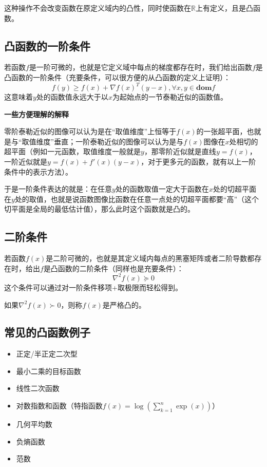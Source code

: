 \documentclass[12pt,a4paper]{book}
\begin{document}
这种操作不会改变函数在原定义域内的凸性，同时使函数在$\mathbb{R}$上有定义，且是凸函数。

\subsection{凸函数的一阶条件}

若函数$f$是一阶可微的，也就是它定义域中每点的梯度都存在时，我们给出函数$f$是凸函数的一阶条件（充要条件，可以很方便的从凸函数的定义上证明）：
$$f(y)\geq f(x)+\nabla f(x)^T(y-x),\forall x,y\in \textbf{dom}f$$
这意味着$y$处的函数值永远大于以$x$为起始点的一节泰勒近似的函数值。

\textbf{一些方便理解的解释}

零阶泰勒近似的图像可以认为是在“取值维度”上恒等于$f(x)$的一张超平面，也就是与“取值维度”垂直；一阶泰勒近似的图像可以认为是与$f(x)$图像在$x$处相切的超平面（例如一元函数，取值维度一般就是$y$，那零阶近似就是直线$y=f(x)$，一阶近似就是$y=f(x)+f'(x)(y-x)$，对于更多元的函数，就有以上一阶条件中的表示方法）。

于是一阶条件表达的就是：在任意$y$处的函数取值一定大于函数在$x$处的切超平面在$y$处的取值，也就是说函数图像比函数在任意一点处的切超平面都要“高”（这个切平面是全局的最低估计值），那么此时这个函数就是凸的。

\subsection{二阶条件}

若函数$f(x)$是二阶可微的，也就是其定义域内每点的黑塞矩阵或者二阶导数都存在时，给出$f$是凸函数的二阶条件（同样也是充要条件）：
$$\nabla^2f(x) \succeq 0$$
这个条件可以通过对一阶条件移项+取极限而轻松得到。

如果$\nabla^2f(x) \succ 0$，则称$f(x)$是严格凸的。

\subsection{常见的凸函数例子}

\begin{itemize}
    \item 正定/半正定二次型
    \item 最小二乘的目标函数
    \item 线性二次函数
    \item 对数指数和函数（特指函数$f(x) = \log(\sum^n_{k=1}\exp(x))$）
    \item 几何平均数
    \item 负熵函数
    \item 范数
\end{itemize}
\end{document}
